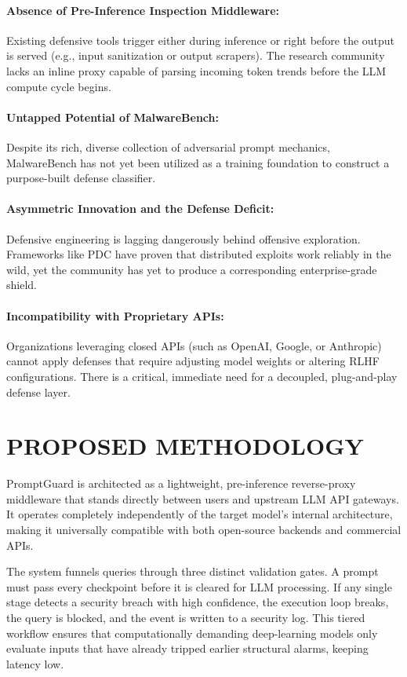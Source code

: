 \documentclass[conference]{IEEEtran}
\begin{document}
\paragraph{Absence of Pre-Inference Inspection Middleware:} Existing defensive tools trigger either during inference or right before the output is served (e.g., input sanitization or output scrapers). The research community lacks an inline proxy capable of parsing incoming token trends before the LLM compute cycle begins.

\paragraph{Untapped Potential of MalwareBench:} Despite its rich, diverse collection of adversarial prompt mechanics, MalwareBench has not yet been utilized as a training foundation to construct a purpose-built defense classifier.

\paragraph{Asymmetric Innovation and the Defense Deficit:} Defensive engineering is lagging dangerously behind offensive exploration. Frameworks like PDC have proven that distributed exploits work reliably in the wild, yet the community has yet to produce a corresponding enterprise-grade shield.

\paragraph{Incompatibility with Proprietary APIs:} Organizations leveraging closed APIs (such as OpenAI, Google, or Anthropic) cannot apply defenses that require adjusting model weights or altering RLHF configurations. There is a critical, immediate need for a decoupled, plug-and-play defense layer.

\section{PROPOSED METHODOLOGY}

PromptGuard is architected as a lightweight, pre-inference reverse-proxy middleware that stands directly between users and upstream LLM API gateways. It operates completely independently of the target model's internal architecture, making it universally compatible with both open-source backends and commercial APIs.

The system funnels queries through three distinct validation gates. A prompt must pass every checkpoint before it is cleared for LLM processing. If any single stage detects a security breach with high confidence, the execution loop breaks, the query is blocked, and the event is written to a security log. This tiered workflow ensures that computationally demanding deep-learning models only evaluate inputs that have already tripped earlier structural alarms, keeping latency low.
\end{document}
